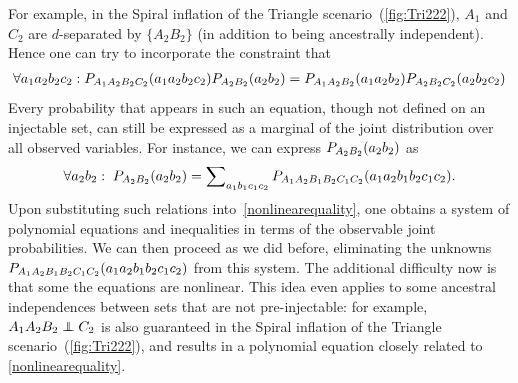 {For example, in the Spiral inflation of the Triangle scenario~(\cref{fig:Tri222}), $A_1$ and $C_2$ are $d$-separated by $\{A_2 B_2\}$ (in addition to being ancestrally independent). Hence one can try to incorporate the constraint that 
\begin{align}\label{nonlinearequality}
\forall{a_1 a_2 b_2 c_2}: \p[A_1 A_2 B_2 C_2]{a_1 a_2 b_2 c_2}\p[A_2 B_2]{a_2 b_2}=\p[A_1 A_2 B_2]{a_1 a_2 b_2}\p[A_2 B_2 C_2]{a_2 b_2 c_2}
\end{align}
 Every probability that appears in such an equation, though not defined on an injectable set, can still be expressed as a marginal of the joint distribution over all observed variables.  For instance, we can express $\p[A_2 B_2]{a_2 b_2}$ as
\begin{align}
\forall{a_2 b_2}:\;\pdf[A_2 B_2]{a_2 b_2} = \sum\nolimits_{a_1 b_1 c_1 c_2}\pdf[A_1 A_2 B_1 B_2 C_1 C_2]{a_1 a_2 b_1 b_2 c_1 c_2}.
\end{align}
Upon substituting such relations into~\cref{nonlinearequality}, one obtains a system of polynomial equations and inequalities in terms of the observable joint probabilities.  We can then proceed as we did before, eliminating the unknowns $\pdf[A_1 A_2 B_1 B_2 C_1 C_2]{a_1 a_2 b_1 b_2 c_1 c_2}$ from this system. The additional difficulty now is that some the equations are nonlinear. This idea even applies to some ancestral independences between sets that are not pre-injectable: for example, $A_1 A_2 B_2 \indep C_2$ is also guaranteed in the Spiral inflation of the Triangle scenario~(\cref{fig:Tri222}), and results in a polynomial equation closely related to \cref{nonlinearequality}.

}
